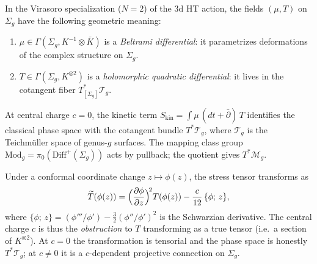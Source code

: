 \begin{proposition}
\label{prop:virasoro-beltrami-phase-space}
In the Virasoro specialization ($N = 2$) of the 3d HT action, the
fields $(\mu, T)$ on $\Sigma_g$ have the following geometric meaning:
\begin{enumerate}[label=(\roman*)]
\item $\mu \in \Gamma(\Sigma_g, K^{-1} \otimes \bar K)$ is a
  \emph{Beltrami differential}: it parametrizes deformations of the
  complex structure on $\Sigma_g$.
\item $T \in \Gamma(\Sigma_g, K^{\otimes 2})$ is a
  \emph{holomorphic quadratic differential}: it lives in the cotangent
  fiber $T^*_{[\Sigma_g]}\mathcal{T}_g$.
\end{enumerate}
At central charge $c = 0$, the kinetic term
$S_{\mathrm{kin}} = \int \mu\,(dt + \bar\partial)\,T$ identifies the
classical phase space with the cotangent bundle
$T^*\mathcal{T}_g$, where $\mathcal{T}_g$ is the Teichm\"uller space
of genus-$g$ surfaces.  The mapping class group
$\mathrm{Mod}_g = \pi_0(\mathrm{Diff}^+(\Sigma_g))$ acts by pullback;
the quotient gives $T^*\mathcal{M}_g$.
\end{proposition}

\begin{proposition}
\label{prop:schwarzian-central-charge}
Under a conformal coordinate change $z \mapsto \phi(z)$, the
stress tensor transforms as
\begin{equation}\label{eq:schwarzian-transformation}
\widetilde{T}(\phi(z))
= \Bigl(\frac{\partial\phi}{\partial z}\Bigr)^{\!2} T(\phi(z))
  - \frac{c}{12}\,\{\phi;\,z\},
\end{equation}
where $\{\phi;\,z\} = (\phi'''/\phi') - \tfrac{3}{2}(\phi''/\phi')^2$
is the Schwarzian derivative.  The central charge $c$ is thus the
\emph{obstruction} to $T$ transforming as a true tensor (i.e.\ a section
of $K^{\otimes 2}$).  At $c = 0$ the transformation is tensorial and
the phase space is honestly $T^*\mathcal{T}_g$; at $c \neq 0$ it is a
$c$-dependent projective connection on $\Sigma_g$.
\end{proposition}


